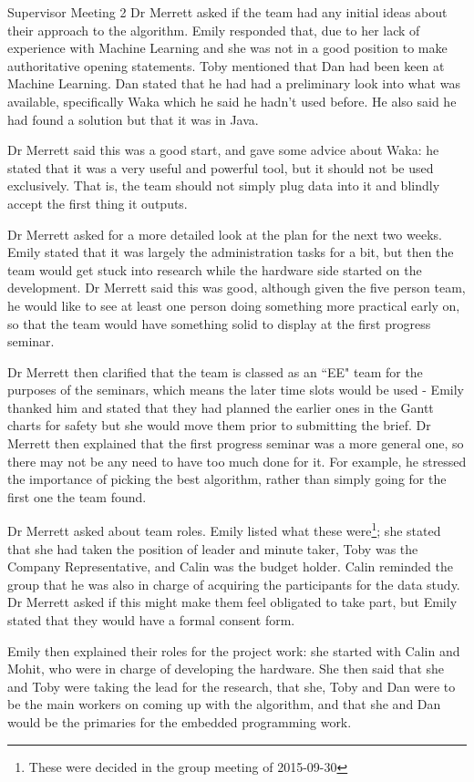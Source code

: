 \documentclass{article}
\begin{document}
\begin{Minutes}{Supervisor Meeting 2}
Dr Merrett asked if the team had any initial ideas about their approach to the algorithm. Emily
responded that, due to her lack of experience with Machine Learning and she was not in a good
position to make authoritative opening statements. Toby mentioned that Dan had been keen at
Machine Learning. Dan stated that he had had a preliminary look into what was available,
specifically Waka which he said he hadn't used before. He also said he had found a solution
but that it was in Java.

Dr Merrett said this was a good start, and gave some advice about Waka: he stated that it was
a very useful and powerful tool, but it should not be used exclusively. That is, the team should
not simply plug data into it and blindly accept the first thing it outputs.

Dr Merrett asked for a more detailed look at the plan for the next two weeks. Emily stated that
it was largely the administration tasks for a bit, but then the team would get stuck into
research while the hardware side started on the development. Dr Merrett said this was good,
although given the five person team, he would like to see at least one person doing something
more practical early on, so that the team would have something solid to display at the first
progress seminar.

Dr Merrett then clarified that the team is classed as an ``EE" team for the purposes of the
seminars, which means the later time slots would be used - Emily thanked him and stated that
they had planned the earlier ones in the Gantt charts for safety but she would move them
prior to submitting the brief. Dr Merrett then explained that the first progress seminar was
a more general one, so there may not be any need to have too much done for it. For example,
he stressed the importance of picking the best algorithm, rather than simply going for the
first one the team found.

Dr Merrett asked about team roles. Emily listed what these were\footnote
{These were decided in the group meeting of 2015-09-30}; she stated that she had taken the
position of leader and minute taker, Toby was the Company Representative, and Calin was the
budget holder. Calin reminded the group that he was also in charge of acquiring the participants
for the data study. Dr Merrett asked if this might make them feel obligated to take part, but
Emily stated that they would have a formal consent form.

Emily then explained their roles for the project work: she started with Calin and Mohit, who
were in charge of developing the hardware. She then said that she and Toby were taking the
lead for the research, that she, Toby and Dan were to be the main workers on coming up with
the algorithm, and that she and Dan would be the primaries for the embedded programming work.


\end{Minutes}
\end{document}

